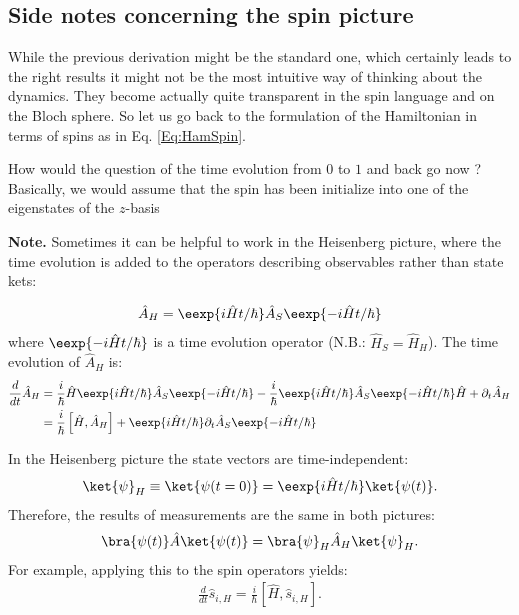 \subsection{Side notes concerning the spin picture}

While the previous derivation might be the standard one, which certainly leads to the right results it might not be the most intuitive way of thinking about the dynamics. They become actually quite transparent in the spin language and on the Bloch sphere. So let us go back to the formulation of the Hamiltonian in terms of spins as in Eq. \eqref{Eq:HamSpin}.

How would the question of the time evolution from $0$ to $1$ and back go now ? Basically, we would assume that the spin has been initialize into one of the eigenstates of the $z$-basis

\textbf{Note.} Sometimes it can be helpful to work in the Heisenberg picture, where the time evolution is added to the operators describing observables rather than state kets:

\begin{align}
	\hat{A}_H=\eexp{i{\hat{H} t}/{\hbar}} \hat{A}_S \eexp{-i{\hat{H} t}/{\hbar}}
\end{align}
where $\eexp{-i{\hat{H} t}/{\hbar}}$ is a time evolution operator (N.B.: $\hat{H}_S = \hat{H}_H$). The time evolution of $\hat{A}_H$ is:
\begin{align}
 \notag \frac{d}{dt} \hat{A}_H &= \frac{i}{\hbar}\hat{H}\eexp{i{\hat{H}t}/{\hbar}}\hat{A}_S \eexp{-i{\hat{H} t}/{\hbar}}-\frac{i}{\hbar} \eexp{i{\hat{H} t}/{\hbar}}\hat{A}_S \eexp{-i{\hat{H}t}/{\hbar}}\hat{H}+\partial_t\hat{A}_H\\
&= \frac{i}{\hbar}\left[\hat{H},\hat{A}_H\right] + \eexp{i{\hat{H}t}/{\hbar}}\partial_t\hat{A}_S\eexp{-i{\hat{H}t}/{\hbar}}
 \end{align}

In the Heisenberg picture the state vectors are time-in\-de\-pen\-dent:
\begin{align}
	\ket{\psi}_H \equiv \ket{\psi(t=0)}=\eexp{i{\hat{H}}t/{\hbar}} \ket{\psi(t)}.
\end{align}
Therefore, the results of measurements are the same in both pictures:
\begin{align}
\bra{\psi(t)}\hat{A}\ket{\psi(t)} = \bra{\psi}_H \hat{A}_H \ket{\psi}_H.
\end{align}
For example, applying this to the spin operators yields:
\begin{align}						\frac{d}{dt}\hat{s}_{i,H}=\frac{i}{\hbar}\left[\hat{H},\hat{s}_{i,H}\right].
\end{align}